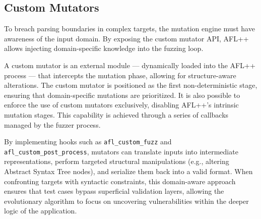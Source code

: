 \subsection{Custom Mutators}

To breach parsing boundaries in complex targets, the mutation engine must have awareness of the input domain. By exposing the custom mutator API, AFL++ allows injecting domain-specific knowledge into the fuzzing loop.

A custom mutator is an external module --- dynamically loaded into the AFL++ process --- that intercepts the mutation phase, allowing for structure-aware alterations. The custom mutator is positioned as the first non-deterministic stage, ensuring that domain-specific mutations are prioritized. It is also possible to enforce the use of custom mutators exclusively, disabling AFL++'s intrinsic mutation stages. This capability is achieved through a series of callbacks managed by the fuzzer process.

By implementing hooks such as \texttt{afl\_custom\_fuzz} and \texttt{afl\_custom\_post\_process}, mutators can translate inputs into intermediate representations, perform targeted structural manipulations (e.g., altering Abstract Syntax Tree nodes), and serialize them back into a valid format. When confronting targets with syntactic constraints, this domain-aware approach ensures that test cases bypass superficial validation layers, allowing the evolutionary algorithm to focus on uncovering vulnerabilities within the deeper logic of the application.
